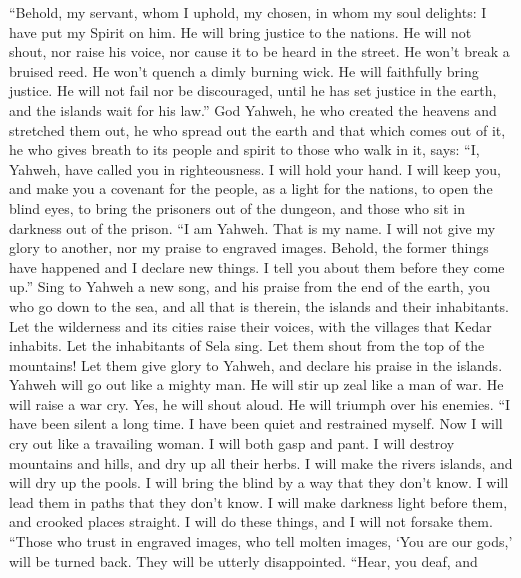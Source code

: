  ``Behold, my servant, whom I uphold, my chosen, in whom
my soul delights: I have put my Spirit on him. He will bring justice to
the nations.  He will not shout, nor raise his voice, nor
cause it to be heard in the street.  He won't break a
bruised reed. He won't quench a dimly burning wick. He will faithfully
bring justice.  He will not fail nor be discouraged, until
he has set justice in the earth, and the islands wait for his law.''
 God Yahweh, he who created the heavens and stretched them
out, he who spread out the earth and that which comes out of it, he who
gives breath to its people and spirit to those who walk in it, says:
 ``I, Yahweh, have called you in righteousness. I will
hold your hand. I will keep you, and make you a covenant for the people,
as a light for the nations,  to open the blind eyes, to
bring the prisoners out of the dungeon, and those who sit in darkness
out of the prison.  ``I am Yahweh. That is my name. I will
not give my glory to another, nor my praise to engraved images.
 Behold, the former things have happened and I declare new
things. I tell you about them before they come up.'' 
Sing to Yahweh a new song, and his praise from the end of the earth, you
who go down to the sea, and all that is therein, the islands and their
inhabitants.  Let the wilderness and its cities raise
their voices, with the villages that Kedar inhabits. Let the inhabitants
of Sela sing. Let them shout from the top of the mountains!
 Let them give glory to Yahweh, and declare his praise in
the islands.  Yahweh will go out like a mighty man. He
will stir up zeal like a man of war. He will raise a war cry. Yes, he
will shout aloud. He will triumph over his enemies.  ``I
have been silent a long time. I have been quiet and restrained myself.
Now I will cry out like a travailing woman. I will both gasp and pant.
 I will destroy mountains and hills, and dry up all their
herbs. I will make the rivers islands, and will dry up the pools.
 I will bring the blind by a way that they don't know. I
will lead them in paths that they don't know. I will make darkness light
before them, and crooked places straight. I will do these things, and I
will not forsake them.  ``Those who trust in engraved
images, who tell molten images, `You are our gods,' will be turned back.
They will be utterly disappointed.  ``Hear, you deaf, and

